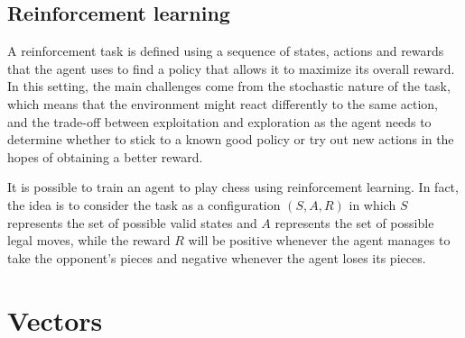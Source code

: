 \documentclass{report}
\begin{document}
\section{Reinforcement learning}
A reinforcement task is defined using a sequence of states, actions and rewards that the agent uses to find a policy that allows it to maximize its overall reward. \newline
In this setting, the main challenges come from the stochastic nature of the task, which means that the environment might react differently to the same action, and the trade-off between exploitation and exploration as the agent needs to determine whether to stick to a known good policy or try out new actions in the hopes of obtaining a better reward.
\begin{examplebox}
    It is possible to train an agent to play chess using reinforcement learning. \newline
    In fact, the idea is to consider the task as a configuration $\displaystyle (S, A, R)$ in which $\displaystyle S$ represents the set of possible valid states and $\displaystyle A$ represents the set of possible legal moves, while the reward $\displaystyle R$ will be positive whenever the agent manages to take the opponent's pieces and negative whenever the agent loses its pieces.
\end{examplebox}

\chapter{Vectors}
\end{document}
